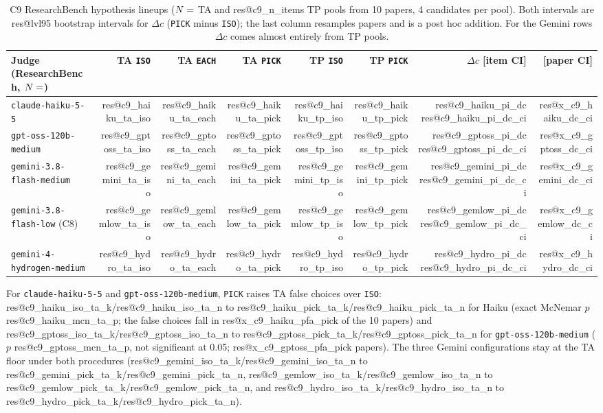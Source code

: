 \documentclass[10pt,twocolumn]{article}
\makeatletter
\newcommand{\res}[1]{\csname res@#1\endcsname}
\makeatother
\begin{document}
\begin{table}[t]
\centering\footnotesize
\setlength{\tabcolsep}{4pt}
\begin{tabular}{lrrrrrrr}
\toprule
Judge (ResearchBench, $N=\res{c9_n_items}$) & TA \texttt{ISO} & TA \texttt{EACH} & TA \texttt{PICK} & TP \texttt{ISO} & TP \texttt{PICK} & $\Delta c$ [item CI] & [paper CI] \\
\midrule
\texttt{claude-haiku-5-5} & \res{c9_haiku_ta_iso} & \res{c9_haiku_ta_each} & \res{c9_haiku_ta_pick} & \res{c9_haiku_tp_iso} & \res{c9_haiku_tp_pick} & \res{c9_haiku_pi_dc} \res{c9_haiku_pi_dc_ci} & \res{x_c9_haiku_dc_ci} \\
\texttt{gpt-oss-120b-medium} & \res{c9_gptoss_ta_iso} & \res{c9_gptoss_ta_each} & \res{c9_gptoss_ta_pick} & \res{c9_gptoss_tp_iso} & \res{c9_gptoss_tp_pick} & \res{c9_gptoss_pi_dc} \res{c9_gptoss_pi_dc_ci} & \res{x_c9_gptoss_dc_ci} \\
\texttt{gemini-3.8-flash-medium} & \res{c9_gemini_ta_iso} & \res{c9_gemini_ta_each} & \res{c9_gemini_ta_pick} & \res{c9_gemini_tp_iso} & \res{c9_gemini_tp_pick} & \res{c9_gemini_pi_dc} \res{c9_gemini_pi_dc_ci} & \res{x_c9_gemini_dc_ci} \\
\texttt{gemini-3.8-flash-low} (C8) & \res{c9_gemlow_ta_iso} & \res{c9_gemlow_ta_each} & \res{c9_gemlow_ta_pick} & \res{c9_gemlow_tp_iso} & \res{c9_gemlow_tp_pick} & \res{c9_gemlow_pi_dc} \res{c9_gemlow_pi_dc_ci} & \res{x_c9_gemlow_dc_ci} \\
\texttt{gemini-4-hydrogen-medium} & \res{c9_hydro_ta_iso} & \res{c9_hydro_ta_each} & \res{c9_hydro_ta_pick} & \res{c9_hydro_tp_iso} & \res{c9_hydro_tp_pick} & \res{c9_hydro_pi_dc} \res{c9_hydro_pi_dc_ci} & \res{x_c9_hydro_dc_ci} \\
\bottomrule
\end{tabular}
\caption{C9 ResearchBench hypothesis lineups ($N=\res{c9_n_items}$ TA and \res{c9_n_items} TP pools from 10 papers, 4 candidates per pool). Both intervals are \res{lvl95} bootstrap intervals for $\Delta c$ (\texttt{PICK} minus \texttt{ISO}); the last column resamples papers and is a post hoc addition. For the Gemini rows $\Delta c$ comes almost entirely from TP pools.}
\label{tab:science}
\end{table}

For \texttt{claude-haiku-5-5} and \texttt{gpt-oss-120b-medium}, \texttt{PICK} raises TA false choices over \texttt{ISO}: \res{c9_haiku_iso_ta_k}/\res{c9_haiku_iso_ta_n} to \res{c9_haiku_pick_ta_k}/\res{c9_haiku_pick_ta_n} for Haiku (exact McNemar $p$ \res{c9_haiku_mcn_ta_p}; the false choices fall in \res{x_c9_haiku_pfa_pick} of the 10 papers) and \res{c9_gptoss_iso_ta_k}/\res{c9_gptoss_iso_ta_n} to \res{c9_gptoss_pick_ta_k}/\res{c9_gptoss_pick_ta_n} for \texttt{gpt-oss-120b-medium} ($p$ \res{c9_gptoss_mcn_ta_p}, not significant at 0.05; \res{x_c9_gptoss_pfa_pick} papers). The three Gemini configurations stay at the TA floor under both procedures (\res{c9_gemini_iso_ta_k}/\res{c9_gemini_iso_ta_n} to \res{c9_gemini_pick_ta_k}/\res{c9_gemini_pick_ta_n}, \res{c9_gemlow_iso_ta_k}/\res{c9_gemlow_iso_ta_n} to \res{c9_gemlow_pick_ta_k}/\res{c9_gemlow_pick_ta_n}, and \res{c9_hydro_iso_ta_k}/\res{c9_hydro_iso_ta_n} to \res{c9_hydro_pick_ta_k}/\res{c9_hydro_pick_ta_n}).
\end{document}
